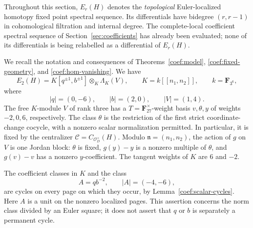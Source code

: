 \documentclass[11pt]{article}
\theoremstyle{definition}
\theoremstyle{remark}
\numberwithin{equation}{section}
\begin{document}
Throughout this section, $E_r(H)$ denotes the \emph{topological}
Euler-localized homotopy fixed point spectral sequence. Its differentials have
bidegree $(r,r-1)$ in cohomological filtration and internal degree. The
complete-local coefficient spectral sequence of
Section~\ref{sec:coefficients} has already been evaluated; none of its
differentials is being relabelled as a differential of $E_r(H)$.

We recall the notation and consequences of
Theorems~\ref{coef:model}, \ref{coef:fixed-geometry}, and
\ref{coef:hom-vanishing}. We have
\begin{equation}
 \label{h:e2}
 E_2(H)=K[q^{\pm1},b^{\pm1}]\otimes_K\Lambda_K(V),
 \qquad K=k[[n_1,n_2]],\qquad k=\mathbf F_{3^6},
\end{equation}
where
\[
 |q|=(0,-6),\qquad |b|=(2,0),\qquad |V|=(1,4).
\]
The free $K$-module $V$ of rank three has a $T=\mathbf F_{27}^{\times}$-weight
basis $v,\theta,y$ of weights $-2,0,6$, respectively. The class $\theta$ is
the restriction of the first strict coordinate-change cocycle, with a
nonzero scalar normalization permitted. In particular, it is fixed by the
centralizer $\mathcal C=C_{\mathcal O_D^\times}(H)$. Modulo
$\mathfrak n=(n_1,n_2)$, the action of $g$ on $V$ is one Jordan block:
$\theta$ is fixed, $g(y)-y$ is a nonzero multiple of $\theta$, and
$g(v)-v$ has a nonzero $y$-coefficient. The tangent weights of $K$ are $6$
and $-2$.

The coefficient classes in $K$ and the class
\begin{equation}
 \label{h:a}
 A=qb^{-2},\qquad |A|=(-4,-6),
\end{equation}
are cycles on every page on which they occur, by
Lemma~\ref{coef:scalar-cycles}. Here $A$ is a unit on the nonzero
localized pages. This assertion concerns the norm class divided by an
Euler square; it does not assert that $q$ or $b$ is separately a permanent
cycle.
\end{document}
